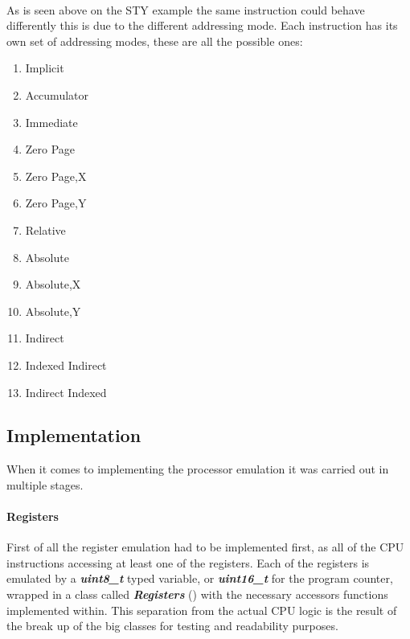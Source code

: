 \documentclass[]{report}
\begin{document}
\paragraph{ }
As is seen above on the STY example the same instruction could behave differently this is due to the different addressing mode. Each instruction has its own set of addressing modes,  these are all the possible ones: 

\begin{enumerate}
	\item Implicit
	\item Accumulator
	\item Immediate
	\item Zero Page
	\item Zero Page,X
	\item Zero Page,Y
	\item Relative
	\item Absolute
	\item Absolute,X
	\item Absolute,Y
	\item Indirect
	\item Indexed Indirect
	\item Indirect Indexed
\end{enumerate}

\subsection{Implementation}
When it comes to implementing the processor emulation it was carried out in multiple stages.
\paragraph{Registers}
First of all the register emulation had to be implemented first, as all of the CPU instructions accessing at least one of the registers. Each of the registers is emulated by a \textbf{\textit{uint8\_t}} typed variable, or  \textbf{\textit{uint16\_t}} for the program counter, wrapped in a class called  \textbf{\textit{Registers}} (\cite{DREG}) with the necessary accessors functions implemented within. This separation from the actual CPU logic is the result of the break up of the big classes for testing and readability purposes.
\end{document}
